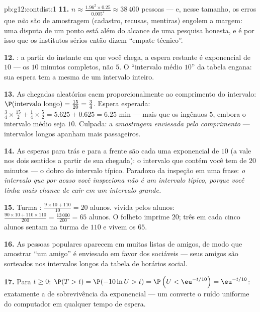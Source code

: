 \begin{solution}{pb:g12:contdist:1}
\textbf{11.} $n \approx \frac{1.96^2 \times 0.25}{0.005^2}
\approx 38\,400$ pessoas --- e, nesse tamanho, os erros que
\emph{não} são de amostragem (cadastro, recusas, mentiras)
engolem a margem: uma disputa de um ponto está além do
alcance de uma pesquisa honesta, e é por isso que os
institutos sérios então dizem ``empate técnico''.

\textbf{12.} : a partir do instante em que
você chega, a espera restante é exponencial de  $10$ ---
os $10$ minutos completos, não $5$. O ``intervalo médio $10$''
da tabela engana: sua espera tem a mesma  de um
intervalo inteiro.

\textbf{13.} As chegadas aleatórias caem proporcionalmente ao
comprimento do intervalo:
$\P(\text{intervalo longo}) = \frac{15}{20} = \frac34$. Espera
esperada: $\frac34 \times \frac{15}{2} + \frac14 \times
\frac52 = 5.625 + 0.625 = 6.25$ min --- mais que os ingênuos
$5$, embora o intervalo médio seja $10$. Culpada: a
\emph{amostragem enviesada pelo comprimento} --- intervalos
longos apanham mais passageiros.

\textbf{14.} As esperas para trás e para a frente são cada uma
exponencial de  $10$ (a  vale nos dois
sentidos a partir de sua chegada): o intervalo que contém você
tem  de $20$ minutos --- o dobro do intervalo típico.
Paradoxo da inspeção em uma frase: \emph{o intervalo que por
acaso você inspeciona não é um intervalo típico, porque você
tinha mais chance de cair em um intervalo grande.}

\textbf{15.} Turma : $\frac{9 \times 10 + 110}{10} = 20$
alunos.  vivida pelos alunos:
$\frac{90 \times 10 + 110 \times 110}{200} = \frac{13\,000}
{200} = 65$ alunos. O folheto imprime $20$; três em cada cinco
alunos sentam na turma de $110$ e vivem os $65$.

\textbf{16.} As pessoas populares aparecem em muitas listas de
amigos, de modo que amostrar ``um amigo'' é enviesado em favor
dos sociáveis --- seus amigos são sorteados nos intervalos
longos da tabela de horários social.

\textbf{17.} Para $t \geq 0$:
$\P(T > t) = \P(-10\ln U > t) = \P\left(U <
\eu^{-t/10}\right) = \eu^{-t/10}$: exatamente a  de
sobrevivência da exponencial --- um  converte o ruído
uniforme do computador em qualquer tempo de espera.


\end{solution}
